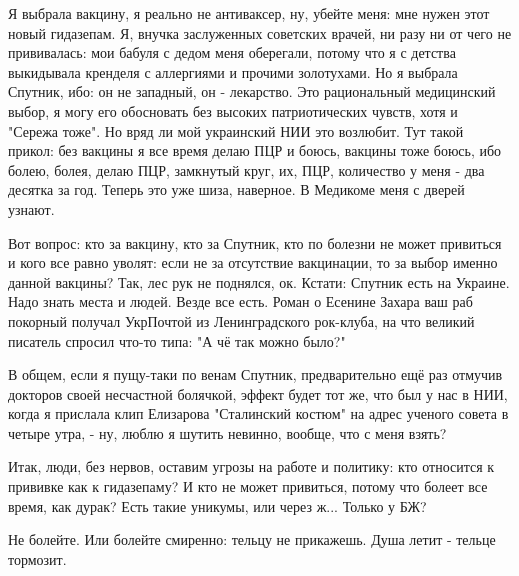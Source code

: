 Я выбрала вакцину, я реально не антиваксер, ну, убейте меня: мне нужен этот
новый гидазепам. Я, внучка заслуженных советских врачей, ни разу ни от чего не
прививалась: мои бабуля с дедом меня оберегали, потому что я с детства
выкидывала кренделя с аллергиями и прочими золотухами. Но я выбрала Спутник,
ибо: он не западный, он - лекарство. Это рациональный медицинский выбор, я могу
его обосновать без высоких патриотических чувств, хотя и "Сережа тоже". Но вряд
ли мой украинский НИИ это возлюбит. Тут такой прикол: без вакцины я все время
делаю ПЦР и боюсь, вакцины тоже боюсь, ибо болею, болея, делаю ПЦР, замкнутый
круг, их, ПЦР, количество у меня - два десятка за год. Теперь это уже шиза,
наверное. В Медикоме меня с дверей узнают. 

Вот вопрос: кто за вакцину, кто за Спутник, кто по болезни не может привиться и
кого все равно уволят: если не за отсутствие вакцинации, то за выбор именно
данной вакцины? Так, лес рук не поднялся, ок. Кстати: Спутник есть на Украине.
Надо знать места и людей. Везде все есть. Роман о Есенине Захара ваш раб
покорный получал УкрПочтой из Ленинградского рок-клуба, на что великий писатель
спросил что-то типа: "А чё так можно было?"

В общем, если я пущу-таки по венам Спутник, предварительно ещё раз отмучив
докторов своей несчастной болячкой, эффект будет тот же, что был у нас в НИИ,
когда я прислала клип Елизарова "Сталинский костюм" на адрес ученого совета в
четыре утра, - ну, люблю я шутить невинно, вообще, что с меня взять? 

Итак, люди, без нервов, оставим угрозы на работе и политику: кто относится к
прививке как к гидазепаму? И кто не может привиться, потому что болеет все
время, как дурак? Есть такие уникумы, или через ж... Только у БЖ? 

Не болейте. Или болейте смиренно: тельцу не прикажешь. Душа летит - тельце
тормозит.

